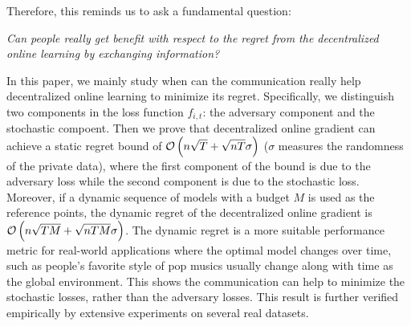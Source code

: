 \documentclass{article}
\begin{document}

Therefore, this reminds us to ask a fundamental question: 

\emph{Can people really get benefit with respect to the regret from the decentralized online learning by exchanging information?}

In this paper, we mainly study when can the communication really help decentralized online learning to minimize its regret. Specifically, we distinguish two components in the loss function $f_{i,t}$: the adversary component and the stochastic compoent. Then we prove that decentralized online gradient can achieve a static regret bound of ${\mathcal{O}\left( n\sqrt{T} + \sqrt{nT}\sigma \right)}$ ($\sigma$ measures the randomness of the private data), where the first component of the bound is due to the adversary loss while the second component is due to the stochastic loss.
Moreover, if a dynamic sequence of models with a budget $M$ is used as the reference points, the dynamic regret of the decentralized online gradient is ${\mathcal{O}\left( n\sqrt{TM} + \sqrt{nTM}\sigma \right)}$. The dynamic regret is a more suitable performance metric for real-world applications where the optimal model changes over time, such as people's favorite style of pop musics usually change along with time as the global environment. This shows the communication can help to minimize the stochastic losses, rather than the adversary losses. This result is further verified empirically by extensive experiments on several real datasets.
\end{document}
